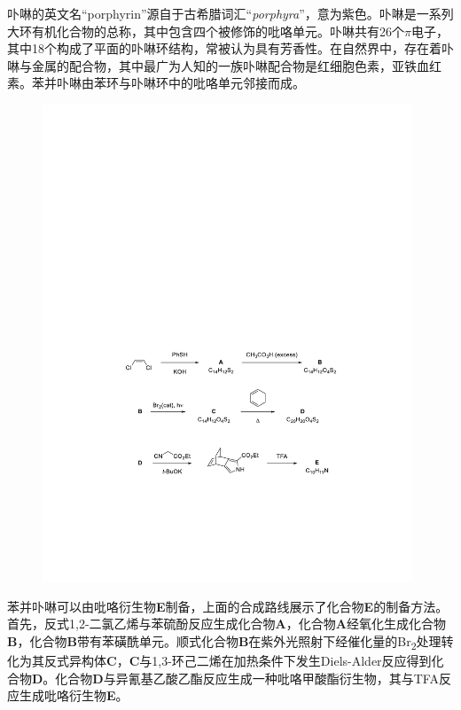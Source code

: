 卟啉的英文名``porphyrin''源自于古希腊词汇``\emph{porphyra}''，意为紫色。卟啉是一系列大环有机化合物的总称，其中包含四个被修饰的吡咯单元。卟啉共有26个$\pi$电子，其中18个构成了平面的卟啉环结构，常被认为具有芳香性。在自然界中，存在着卟啉与金属的配合物，其中最广为人知的一族卟啉配合物是红细胞色素，亚铁血红素。苯并卟啉由苯环与卟啉环中的吡咯单元邻接而成。

\begin{figure}[h!]
	\centering
	\includegraphics[width=11cm]{./pic/t11-1.pdf}
\end{figure}

苯并卟啉可以由吡咯衍生物\textbf{E}制备，上面的合成路线展示了化合物\textbf{E}的制备方法。首先，反式1,2-二氯乙烯与苯硫酚反应生成化合物\textbf{A}，化合物\textbf{A}经氧化生成化合物\textbf{B}，化合物\textbf{B}带有苯磺酰单元。顺式化合物\textbf{B}在紫外光照射下经催化量的Br\textsubscript{2}处理转化为其反式异构体\textbf{C}，\textbf{C}与1,3-环己二烯在加热条件下发生Diels-Alder反应得到化合物\textbf{D}。化合物\textbf{D}与异氰基乙酸乙酯反应生成一种吡咯甲酸酯衍生物，其与TFA反应生成吡咯衍生物\textbf{E}。

